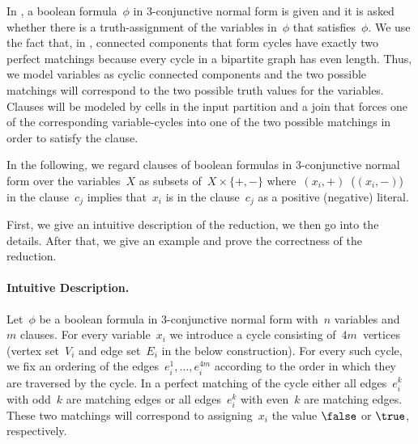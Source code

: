  In \ptSATs{}, a boolean formula~$\phi$ in 3-conjunctive normal form is given and it is asked whether there is a truth-assignment of the variables in~$\phi$ that satisfies~$\phi$. We use the fact that, in \pCBMs{}, connected components that form cycles have exactly two perfect matchings because every cycle in a bipartite graph has even length. Thus, we model variables as cyclic connected components and the two possible matchings will correspond to the two possible truth values for the variables. Clauses will be modeled by cells in the input partition and a join that forces one of the corresponding variable-cycles into one of the two possible matchings in order to satisfy the clause. 

In the following, we regard clauses of boolean formulas in 3-conjunctive normal form over the variables~$X$ as subsets of~$X \times \{+, -\}$ where~$(x_i, +)$~($(x_i, -)$) in the clause~$c_j$ implies that~$x_i$ is in the clause~$c_j$ as a positive (negative) literal.

First, we give an intuitive description of the reduction, we then go into the details. After that, we give an example and prove the correctness of the reduction.

\paragraph{Intuitive Description.} Let~$\phi$ be a boolean formula in 3-conjunctive normal form with~$n$ variables and~$m$ clauses. For every variable~$x_i$ we introduce a cycle consisting of~$4m$~vertices (vertex set~$V_i$ and edge set~$E_i$ in the below construction). For every such cycle, we fix an ordering of the edges~$e_i^1, \ldots, e_i^{4m}$ according to the order in which they are traversed by the cycle. In a perfect matching of the cycle either all edges~$e_i^k$ with odd~$k$ are matching edges or all edges~$e_i^k$ with even~$k$ are matching edges. These two matchings will correspond to assigning~$x_i$ the value $\false$ or $\true$, respectively.

